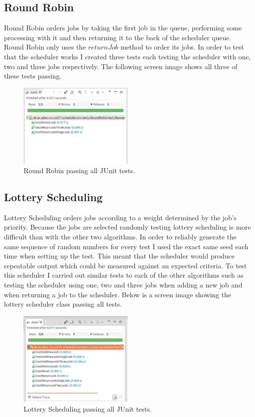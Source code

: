\documentclass{article}
\begin{document}
\subsection{Round Robin}
Round Robin orders jobs by taking the first job in the queue, performing some processing with it and then returning it to the back of the scheduler queue. Round Robin only uses the $returnJob$ method to order its jobs. In order to test that the scheduler works I created three tests each testing the scheduler with one, two and three jobs respectively. The following screen image shows all three of these tests passing.

\begin{figure}[H]
\centering
\includegraphics[width=0.5\textwidth]{img/rr_test.png}
\caption{Round Robin passing all JUnit tests.}
\label{fig:rr-test}
\end{figure}

\subsection{Lottery Scheduling}
Lottery Scheduling orders jobs according to a weight determined by the job's priority. Because the jobs are selected randomly testing lottery scheduling is more difficult than with the other two algorithms. In order to reliably generate the same sequence of random numbers for every test I used the exact same seed each time when setting up the test. This meant that the scheduler would produce repeatable output which could be measured against an expected criteria. To test this scheduler I carried out similar tests to each of the other algorithms such as testing the scheduler using one, two and three jobs when adding a new job and when returning a job to the scheduler. Below is a screen image showing the lottery scheduler class passing all tests.

\begin{figure}[H]
\centering
\includegraphics[width=0.5\textwidth]{img/lott_test.png}
\caption{Lottery Scheduling passing all JUnit tests.}
\label{fig:lott-test}
\end{figure}
\end{document}
